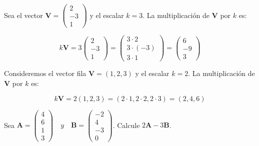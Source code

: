 \begin{example}
Sea el vector \( \mathbf{V} = \begin{pmatrix} 2 \\ -3 \\ 1 \end{pmatrix} \) y el escalar \( k = 3 \). La multiplicación de \( \mathbf{V} \) por \( k \) es:

\[
k \boldsymbol{V} = 3 \begin{pmatrix} 2 \\ -3 \\ 1 \end{pmatrix} = \begin{pmatrix} 3 \cdot 2 \\ 3 \cdot (-3) \\ 3 \cdot 1 \end{pmatrix} = \begin{pmatrix} 6 \\ -9 \\ 3 \end{pmatrix}
\]
\end{example}
\begin{example}
    Consideremos el vector fila \( \mathbf{V} = (1, 2, 3) \) y el escalar \( k = 2 \). La multiplicación de \( \mathbf{V} \) por \( k \) es:

\[
k \boldsymbol{V} = 2 (1, 2, 3) = (2 \cdot 1, 2 \cdot 2, 2 \cdot 3) = (2, 4, 6)
\]

\end{example}
\begin{exercise}
 Sea $\mathbf{A}=\left(\begin{array}{l}4 \\ 6 \\ 1 \\ 3\end{array}\right) \quad y \quad \mathbf{B}=\left(\begin{array}{r}-2 \\ 4 \\ -3 \\ 0\end{array}\right)$. Calcule $2 \mathbf{A}-3 \mathbf{B}$.   
\end{exercise}

